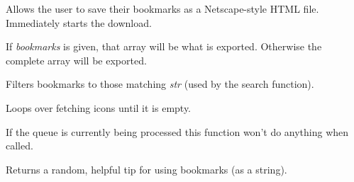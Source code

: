 \documentclass[letterpaper,10pt,openany]{sphinxmanual}
\begin{document}

\begin{fulllineitems}
\label{Applications/terminal/plugin_bookmarks:GateOne.Bookmarks.exportBookmarks}
Allows the user to save their bookmarks as a Netscape-style HTML file.  Immediately starts the download.

If \emph{bookmarks} is given, that array will be what is exported.  Otherwise the complete  array will be exported.

\end{fulllineitems}


\begin{fulllineitems}
\label{Applications/terminal/plugin_bookmarks:GateOne.Bookmarks.filterBookmarksBySearchString}
Filters bookmarks to those matching \emph{str} (used by the search function).

\end{fulllineitems}


\begin{fulllineitems}
\label{Applications/terminal/plugin_bookmarks:GateOne.Bookmarks.flushIconQueue}
Loops over  fetching icons until it is empty.

If the queue is currently being processed this function won't do anything when called.

\end{fulllineitems}


\begin{fulllineitems}
\label{Applications/terminal/plugin_bookmarks:GateOne.Bookmarks.generateTip}
Returns a random, helpful tip for using bookmarks (as a string).

\end{fulllineitems}
\end{document}
